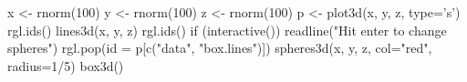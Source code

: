 \begin{SeeAlso}\relax
{}
\end{SeeAlso}
\begin{Examples}
\begin{ExampleCode}
  x <- rnorm(100)
  y <- rnorm(100)
  z <- rnorm(100)
  p <- plot3d(x, y, z, type='s')
  rgl.ids()
  lines3d(x, y, z)
  rgl.ids()
  if (interactive()) {
    readline("Hit enter to change spheres")
    rgl.pop(id = p[c("data", "box.lines")])
    spheres3d(x, y, z, col="red", radius=1/5)
    box3d()
  }
\end{ExampleCode}
\end{Examples}

